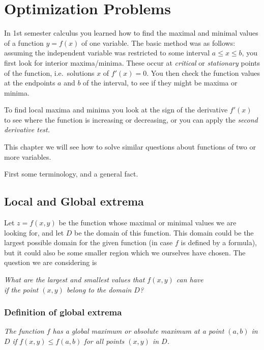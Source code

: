 \chapter{Optimization Problems} %
In 1st semester calculus you learned how to find the maximal and minimal
values of a function $y=f(x)$ of one variable.  The basic method was as
follows: assuming the independent variable was restricted to some interval
$a\leq x\leq b$, you first look for interior maxima/minima.  These occur at
\emph{critical} or \emph{stationary} points of the function, i.e.\
solutions $x$ of $f'(x)=0$.  You then check the function values at the
endpoints $a$ and $b$ of the interval, to see if they might be maxima or
minima.

To find local maxima and minima you look at the sign of the derivative
$f'(x)$ to see where the function is increasing or decreasing, or you can
apply the \emph{second derivative test.}

This chapter we will see how to solve similar questions about functions of
two or more variables.

First some terminology, and a general fact.


\section{Local and Global extrema}  %

\label{sec:local-versus-global} 
Let $z=f(x,y)$ be the function whose maximal or minimal values we are
looking for, and let $D$ be the domain of this function.  This domain could
be the largest possible domain for the given function (in case $f$ is
defined by a formula), but it could also be some smaller region which we
ourselves have chosen.  The question we are considering is
\begin{center}
  \itshape What are the largest and smallest values that $f(x,y)$ can have\\
  if the point $(x,y)$ belong to the domain $D$?
\end{center}
\subsection{Definition of global extrema}  %

\label{sec:def-global-extrema}\itshape 
The function $f$ has a \emph{global maximum} or \emph{absolute maximum} at
a point $(a,b)$ in $D$ if $f(x,y)\leq f(a,b)$ for all points $(x,y)$ in
$D$.

